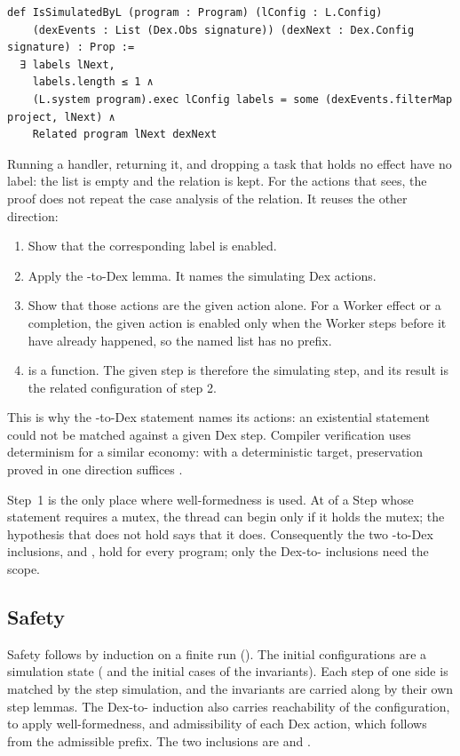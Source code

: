 \begin{Verbatim}
def IsSimulatedByL (program : Program) (lConfig : L.Config)
    (dexEvents : List (Dex.Obs signature)) (dexNext : Dex.Config signature) : Prop :=
  ∃ labels lNext,
    labels.length ≤ 1 ∧
    (L.system program).exec lConfig labels = some (dexEvents.filterMap project, lNext) ∧
    Related program lNext dexNext
\end{Verbatim}

Running a handler, returning it, and dropping a task that holds no effect
have no \Lang{} label: the list is empty and the relation is kept. For the
actions that \Lang{} sees, the proof does not repeat the case analysis of
the relation. It reuses the other direction:
\begin{enumerate}
\item Show that the corresponding \Lang{} label is enabled.
\item Apply the \Lang{}-to-Dex lemma. It names the simulating Dex actions.
\item Show that those actions are the given action alone. For a Worker
  effect or a completion, the given action is enabled only when the Worker
  steps before it have already happened, so the named list has no prefix.
\item {} is a function. The given step is therefore the
  simulating step, and its result is the related configuration of step 2.
\end{enumerate}
This is why the \Lang{}-to-Dex statement names its actions: an existential
statement could not be matched against a given Dex step. Compiler
verification uses determinism for a similar economy: with a deterministic
target, preservation proved in one direction suffices
\cite{leroy2009compcert}.

Step~1 is the only place where well-formedness is used. At
 of a Step whose statement requires a mutex, the
\Lang{} thread can begin only if it holds the mutex; the hypothesis that
 does not hold says that it does. Consequently the
two \Lang{}-to-Dex inclusions,  and
, hold for every program; only the
Dex-to-\Lang{} inclusions need the scope.

\subsection{Safety}

Safety follows by induction on a finite run
(). The initial configurations are a simulation
state ( and the initial cases of the invariants). Each
step of one side is matched by the step simulation, and the invariants are
carried along by their own step lemmas. The Dex-to-\Lang{} induction also
carries reachability of the \Lang{} configuration, to apply
well-formedness, and admissibility of each Dex action, which follows from
the admissible prefix. The two inclusions are 
and .

